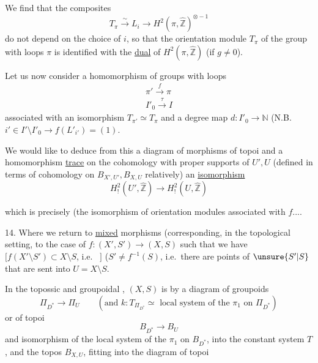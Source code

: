 
We find that the composites
\[
T_\pi \xrightarrow{\sim} L_i \longrightarrow
H^2(\pi,\widehat{\mathbb Z})^{\otimes-1}
\]
do not depend on the choice of $i$, so that the orientation module $T_\pi$ of the group  with loops $\pi$ is identified with the \uline{dual} of $H^2(\pi,\widehat{\mathbb Z})$ (if $g\ne0$).

Let us now consider a homomorphism of groups with loops
\[
\begin{gathered}
\pi'\xrightarrow{f}\pi\\
I'_0\xrightarrow{\tau}I
\end{gathered}
\]
associated with an isomorphism $T_{\pi'}\simeq T_\pi$ and a degree map
$d:I'_0\longrightarrow\mathbb N$
(N.B. $i'\in I'\setminus I'_0\longrightarrow f(L'_{i'})=(1)$.

We would like to deduce from this a diagram of morphisms of topoi
and a homomorphism \uline{trace} on the cohomology with proper supports of $U',U$ (defined in terms of cohomology on $B_{X',U'}, B_{X,U}$ relatively)
   an \uline{isomorphism}
\[
H^2_!(U',\widehat{\mathbb Z})\longrightarrow
H^2_!(U,\widehat{\mathbb Z})
\]


which is precisely  (the isomorphism of orientation modules associated with $f$....

14. Where we return to \uline{mixed} morphisms (corresponding, in the topological setting, to the case of
$f:(X',S')\longrightarrow(X,S)$ such that we have
$[f(X'\setminus S')\subset X\setminus S$, i.e.\  $]$
 ($S'\ne f^{-1}(S)$, i.e.\ there are points of $\unsure{S'|S}$ that are sent into $U=X\setminus S$.

In the topossic and groupoidal  , $(X,S)$ is   by a diagram of groupoids
\[
\Pi_{D^*}\longrightarrow\Pi_U
\qquad
(\text{and }k:T_{\Pi_{D^*}}\simeq
\text{ local system of the }\pi_1\text{ on }\Pi_{D^*})
\]
or of topoi
\[
B_{D^*}\longrightarrow B_U
\]
and  isomorphism  of the local system of the $\pi_1$ on $B_{D^*}$, into the  constant system $T$,
and the topos $B_{X,U}$, fitting into the diagram  of topoi

